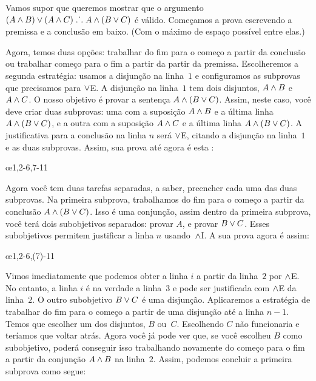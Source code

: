 Vamos supor que queremos mostrar que o argumento $(A \wedge B) \vee (A \wedge C) \mathrel{\ldotp\dot{}\,\ldotp} A \wedge (B \vee C)$ \'e v\'alido. Come\c camos a prova escrevendo a premissa e a conclus\~ao em baixo. (Com o m\'aximo de espa\c co poss\'ivel entre elas.) 
\begin{fitchproof}
\ellipsesline
\end{fitchproof}
Agora, temos duas op\c c\~oes: trabalhar do fim para o come\c co a partir da conclus\~ao ou trabalhar come\c co para o fim a partir da partir da premissa. Escolheremos a segunda estrat\'egia: usamos a disjun\c c\~ao na linha~$1$ e configuramos as subprovas que precisamos para  $\vee$E. A disjun\c c\~ao na linha~$1$ tem dois disjuntos, $A \wedge B$ e $A \wedge C$. 
O nosso objetivo \'e provar a senten\c ca $A \wedge (B \vee C)$. Assim, neste caso, voc\^e  deve criar duas subprovas:  uma com a suposi\c c\~ao $A \wedge B$ e a \'ultima linha $A \wedge (B \vee C)$, e a  outra com a suposi\c c\~ao $A \wedge C$ e a \'ultima linha $A \wedge (B \vee C)$. A justificativa para a conclus\~ao na linha $n$  ser\'a  $\vee$E,  citando a disjun\c c\~ao na linha~$1$ e as duas subprovas. Assim, sua prova at\'e  agora \'e esta :
 

\begin{fitchproof}
	\open
	\ellipsesline 
	\close
	\open
	\ellipsesline
	\close
	\oe{1,2-6,7-11}
\end{fitchproof}
Agora voc\^e tem duas tarefas separadas, a saber,  preencher cada uma das duas subprovas. Na primeira subprova, trabalhamos do fim para o come\c co a partir da conclus\~ao $A \wedge (B \vee C)$. Isso \'e uma conjun\c c\~ao, assim dentro da primeira subprova, voc\^e ter\'a dois subobjetivos separados: provar $A$, e provar $B \vee C$. Esses subobjetivos permitem justificar a linha $n$ usando~$\wedge$I. A sua prova agora \'e assim:
 

\begin{fitchproof}
	\open
	\ellipsesline
	\ellipsesline
	\close
	\open
	\ellipsesline
	\close
	\oe{1,2-6,(7)-11}
\end{fitchproof}
Vimos imediatamente que podemos obter a linha $i$ a partir da linha~$2$ por $\wedge$E. No entanto, a linha $i$ \'e na verdade a linha~$3$ e pode ser justificada com $\wedge$E  da linha~$2$. O outro subobjetivo $B \vee C$ \'e uma disjun\c c\~ao.
Aplicaremos a estrat\'egia de trabalhar do fim para o come\c co a partir de uma disjun\c c\~ao at\'e a linha $n-1$. Temos que escolher um dos disjuntos, $B$ ou~$C$. 
Escolhendo $C$  n\~ao funcionaria e ter\'iamos que voltar atr\'as. Agora voc\^e j\'a pode ver que, se voc\^e escolheu $B$ como subobjetivo, poder\'a conseguir isso trabalhando novamente do come\c co para o fim a partir da conjun\c c\~ao $A \wedge B$ na linha~$2$. Assim, podemos concluir a primeira subprova como segue:
 

